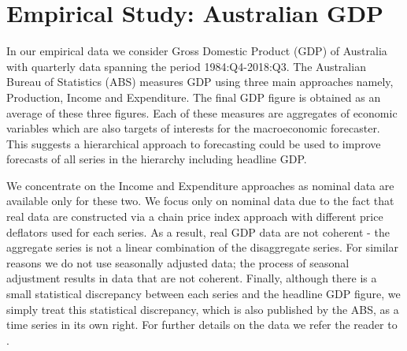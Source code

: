 \documentclass[graybox]{svmult}
\begin{document}

\clearpage

\section{Empirical Study: Australian GDP}\label{sec:data}

In our empirical data we consider Gross Domestic Product (GDP) of Australia with quarterly data spanning the period 1984:Q4-2018:Q3. The Australian Bureau of Statistics (ABS) measures GDP using three main approaches namely, Production, Income and Expenditure. The final GDP figure is obtained as an average of these three figures. Each of these measures are aggregates of economic variables which are also targets of interests for the macroeconomic forecaster. This suggests a hierarchical approach to forecasting could be used to improve forecasts of all series in the hierarchy including headline GDP.

We concentrate on the Income and Expenditure approaches as nominal data are available only for these two. We focus only on  nominal data due to the fact that real data are constructed via a chain price index approach with different price deflators used for each series. As a result, real GDP data are not coherent - the aggregate series is not a linear combination of the disaggregate series.  For similar reasons we do not use seasonally adjusted data; the process of seasonal adjustment results in data that are not coherent.  Finally, although there is a small statistical discrepancy between each series and the headline GDP figure, we simply treat this statistical discrepancy, which is also published by the ABS, as a time series in its own right. For further details on the data we refer the reader to \citep{ABS2018}.
\end{document}
